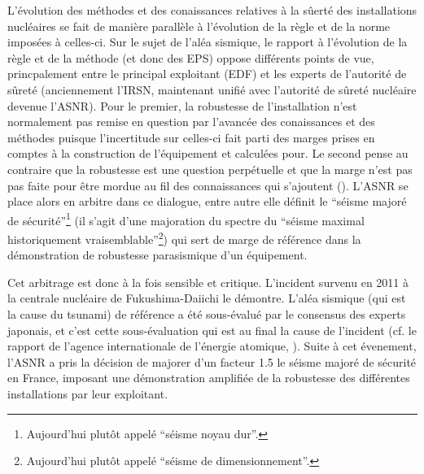 L'évolution des méthodes et des conaissances relatives à la sûerté des installations nucléaires se fait de manière parallèle à l'évolution de la règle et de la norme imposées à celles-ci. 
Sur le sujet de l'aléa sismique, le rapport à l'évolution de la règle et de la méthode (et donc des EPS) oppose différents points de vue, princpalement entre le principal exploitant (EDF) et les experts de l'autorité de sûreté (anciennement l'IRSN, maintenant unifié avec l'autorité de sûreté nucléaire devenue l'ASNR). 
Pour le premier, la robustesse de l'installation n'est normalement pas remise en question par l'avancée des conaissances et des méthodes puisque l’incertitude sur celles-ci fait parti des marges prises en comptes à la construction de l'équipement et calculées pour. Le second pense au contraire que la robustesse est une question perpétuelle et que la marge n’est pas pas faite pour être mordue au fil des connaissances qui s’ajoutent (\cite{roger_seisme_2020}). 
L'ASNR se place alors en arbitre dans ce dialogue, entre autre elle définit le ``séisme majoré de sécurité''\footnote{Aujourd'hui plutôt appelé ``séisme noyau dur''.} (il s'agit d'une majoration du spectre du ``séisme maximal historiquement vraisemblable''\footnote{Aujourd'hui plutôt appelé ``séisme de dimensionnement''.}) qui sert de marge de référence dans la démonstration de robustesse parasismique d'un équipement. %
%


Cet arbitrage est donc à la fois sensible et critique.
L'incident survenu en 2011 à la centrale nucléaire de Fukushima-Daiichi le démontre. L'aléa sismique (qui est la cause du tsunami) de référence
a été sous-évalué par le consensus des experts japonais, et c'est cette sous-évaluation qui est au final la cause de l'incident (cf. le rapport de l'agence internationale de l'énergie atomique, \cite{iaea_fukushima_2015}).
Suite à cet évenement, l'ASNR a pris la décision de majorer d'un facteur 1.5 le séisme majoré de sécurité en France, imposant une démonstration amplifiée de la robustesse des différentes installations par leur exploitant.



